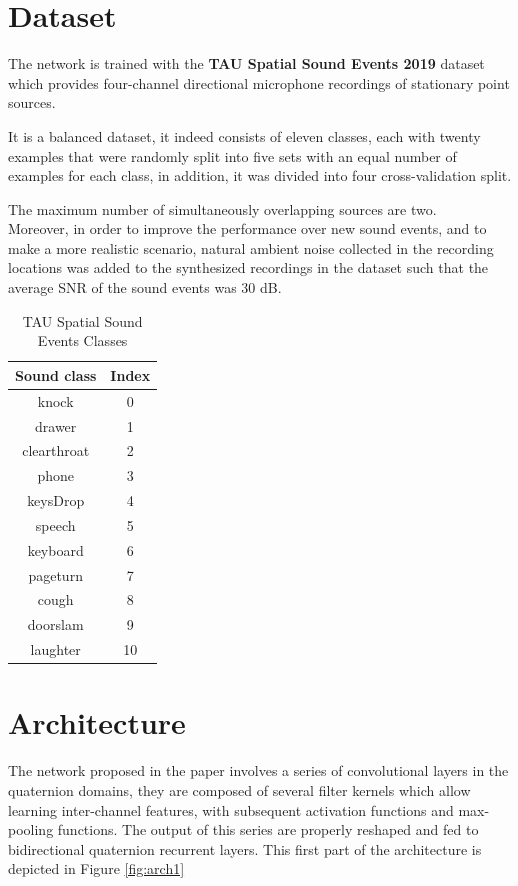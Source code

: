 \documentclass[11pt]{article}
\begin{document}
\newpage
\section{Dataset}\label{cha:data}

The network is trained with the \textbf{TAU Spatial Sound Events 2019} dataset which provides four-channel directional microphone recordings of stationary point sources.

\noindent
It is a balanced dataset, it indeed consists of eleven classes, each with twenty examples that were randomly split into five sets with an equal number of examples for each class, in addition, it was divided into four cross-validation split.

\noindent
The maximum number of simultaneously overlapping sources are two.\\
Moreover, in order to improve the performance over new sound events, and to make a more realistic scenario, natural ambient noise collected in the recording locations was added to the synthesized recordings in the dataset such that the average SNR of the sound events was 30 dB.
\newline
\begin{table}[ht]
	\caption{TAU Spatial Sound Events Classes}
	\centering
	\begin{tabular}{c c}
		\hline\hline
		Sound class & Index \\ [0.5ex]
		\hline
		knock & 0 \\
		drawer & 1 \\
		clearthroat & 2 \\
		phone & 3 \\
		keysDrop & 4 \\
		speech & 5 \\
		keyboard & 6 \\
		pageturn & 7 \\
		cough & 8 \\
		doorslam & 9 \\
		laughter & 10\\
		\hline		
	\end{tabular}
	\label{table:classes}
\end{table}

\newpage
\section{Architecture}\label{cha:arch}

The network proposed in the paper \cite{paper2020} involves a series of convolutional layers in the quaternion domains, they are composed of several filter kernels which allow learning inter-channel features, with subsequent activation functions and max-pooling functions. The output of this series are properly reshaped and fed to bidirectional quaternion recurrent layers. This first part of the architecture is depicted in Figure \ref{fig:arch1}
\end{document}
